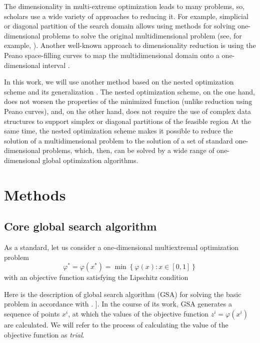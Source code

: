 \documentclass[entropy,article,submit,moreauthors,pdftex]{Definitions/mdpi}
\begin{document}
The dimensionality in multi-extreme optimization leads to many problems, so, scholars use a wide variety of approaches to reducing it.  
For example, simplicial or diagonal partition of the search domain allows using methods for solving one-dimensional problems to solve the original multidimensional problem (see, for example,  \cite{PaulaviciusZilinskas2014,Sergeyev2017,Sergeyev2013}). 
Another well-known approach to dimensionality reduction is using the Peano space-filling curves to map the multidimensional domain onto a one-dimensional interval \cite{Strongin2000}.

In this work, we will use another method based on the nested optimization scheme \cite{Shi2000,Grishagin2001,VanDam2010,Grishagin2015} and its generalization \cite{Grishagin2016,Grishagin2016_1}.
The nested optimization scheme, on the one hand, does not worsen the properties of the minimized function (unlike reduction using Peano curves), and, on the other hand, does not require the use of complex data structures to support simplex or diagonal partitions of the feasible region
At the same time, the nested optimization scheme makes it possible to reduce the solution of a multidimensional problem to the solution of a set of standard one-dimensional problems, which, then, can be solved by a wide range of one-dimensional global optimization algorithms.

\section{Methods}

\subsection{Core global search algorithm}\label{CoreGSA}

As a standard, let us consider a one-dimensional multiextremal optimization problem
\begin{equation}\label{uni_problem}
\varphi^\ast = \varphi(x^\ast)=\min{\left\{\varphi(x):x\in \left[0,1\right] 
\right\}}
\end{equation}
with an objective function satisfying the Lipschitz condition 

Here is the description of global search algorithm (GSA) for solving the basic problem in accordance with \cite{Strongin2000}.
]. In the course of its work, GSA generates a sequence of points  $x^i$, at which the values of the objective function  $z^i=\varphi(x^i)$ are calculated. 
We will refer to the process of calculating the value of the objective function as  \textit{trial}.
\end{document}
